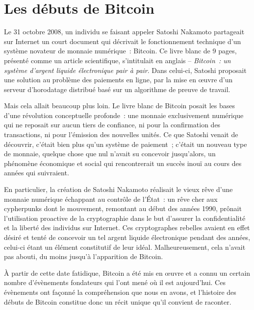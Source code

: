 
\chapter{Les débuts de Bitcoin}
\label{ch:mythe}


Le 31 octobre 2008, un individu se faisant appeler Satoshi Nakamoto partageait sur Internet un court document qui décrivait le fonctionnement technique d'un système novateur de monnaie numérique~: Bitcoin. Ce livre blanc de 9 pages, présenté comme un article scientifique, s'intitulait en anglais  -- \emph{Bitcoin~: un système d'argent liquide électronique pair à pair}. Dans celui-ci, Satoshi proposait une solution au problème des paiements en ligne, par la mise en œuvre d'un serveur d'horodatage distribué basé sur un algorithme de preuve de travail.

Mais cela allait beaucoup plus loin. Le livre blanc de Bitcoin posait les bases d'une révolution conceptuelle profonde~: une monnaie exclusivement numérique qui ne reposait sur aucun tiers de confiance, ni pour la confirmation des transactions, ni pour l'émission des nouvelles unités. Ce que Satoshi venait de découvrir, c'était bien plus qu'un système de paiement~; c'était un nouveau type de monnaie, quelque chose que nul n'avait su concevoir jusqu'alors, un phénomène économique et social qui rencontrerait un succès inouï au cours des années qui suivraient.

En particulier, la création de Satoshi Nakamoto réalisait le vieux rêve d'une monnaie numérique échappant au contrôle de l'État~: un rêve cher aux cypherpunks dont le mouvement, remontant au début des années 1990, prônait l'utilisation proactive de la cryptographie dans le but d'assurer la confidentialité et la liberté des individus sur Internet. Ces cryptographes rebelles avaient en effet désiré et tenté de concevoir un tel argent liquide électronique pendant des années, celui-ci étant un élément constitutif de leur idéal. Malheureusement, cela n'avait pas abouti, du moins jusqu'à l'apparition de Bitcoin.

À partir de cette date fatidique, Bitcoin a été mis en œuvre et a connu un certain nombre d'évènements fondateurs qui l'ont mené où il est aujourd'hui. Ces évènements ont façonné la compréhension que nous en avons, et l'histoire des débuts de Bitcoin constitue donc un récit unique qu'il convient de raconter.

